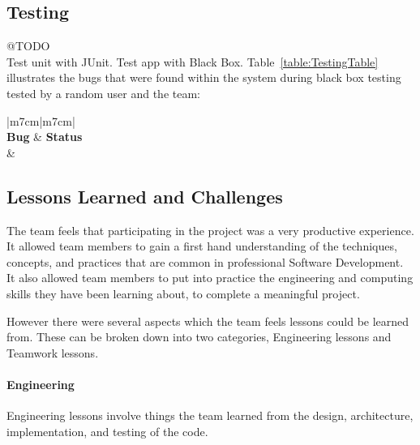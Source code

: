 \documentclass[11pt]{article}
\begin{document}
\subsection{Testing} 
@TODO
\\Test unit with JUnit. Test app with Black Box. 
Table~\ref{table:TestingTable} illustrates the bugs that were found within the system during black box testing tested by a random user and the team:
\begin{center}
	\begin{table}[!htb]
	\begin{tabular}{|m{7cm}|m{7cm}|}
		 \hline
		 \\ 
		\hline 
		 \centering \textbf{Bug} & \textbf{Status}\\\hline
		 &  \\  \hline
		
	\end{tabular}
	\caption{Testing Table}
		\label{table:TestingTable}
	\end{table}
\end{center}

\pagebreak
\subsection{Lessons Learned and Challenges}

The team feels that participating in the project was a very productive experience. It allowed team members to gain a first hand understanding of the techniques, concepts, and practices that are common in professional Software Development. It also allowed team members to put into practice the engineering and computing skills they have been learning about, to complete a meaningful project. 

However there were several aspects which the team feels lessons could be learned from.
These can be broken down into two categories, Engineering lessons and Teamwork lessons.

\paragraph{Engineering}

Engineering lessons involve things the team learned from the design, architecture, implementation, and testing of the code.
\end{document}

